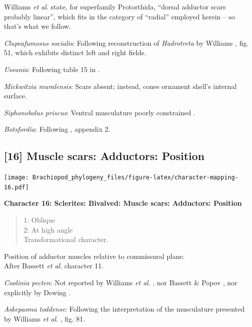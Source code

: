 \documentclass[]{book}
\theoremstyle{definition}
\theoremstyle{definition}
\theoremstyle{definition}
\theoremstyle{remark}
\begin{document}
Williams \emph{et al}.
\citeyearpar{Williams2000BrachiopodaLinguliformea} state, for
superfamily Protorthida, ``dorsal adductor scars probably linear'',
which fits in the category of ``radial'' employed herein -- so that's
what we follow.

\emph{Clupeafumosus socialis}: Following reconstruction of
\emph{Hadrotreta} by Williams
\citeyearpar{Williams2000BrachiopodaLinguliformea}, fig. 51, which
exhibits distinct left and right fields.

\emph{Ussunia}: Following table 15 in
\citet{Williams2000BrachiopodaLinguliformea}.

\emph{Mickwitzia muralensis}: Scars absent; instead, cones ornament
shell's internal surface.

\emph{Siphonobolus priscus}: Ventral musculature poorly constrained
\citep{Williams2000BrachiopodaLinguliformea, Popov2009Earlyontogeny}.

\emph{Botsfordia}: Following \citet{Williams1998Thediversity}, appendix
2.

\hypertarget{muscle-scars-adductors-position}{%
\subsection*{{[}16{]} Muscle scars: Adductors:
Position}\label{muscle-scars-adductors-position}}

\texttt{[image: Brachiopod\_phylogeny\_files/figure-latex/character-mapping-16.pdf]}

\textbf{Character 16: Sclerites: Bivalved: Muscle scars: Adductors:
Position}

\begin{quote}
1: Oblique\\
2: At high angle\\
Transformational character.
\end{quote}

Position of adductor muscles relative to commissural plane.\\
After Bassett \emph{et al}.
\citeyearpar{Bassett2001Functionalmorphology} character 11.

\emph{Coolinia pecten}: Not reported by Williams \emph{et al}.
\citeyearpar{Williams2000BrachiopodaLinguliformea}, nor Bassett \& Popov
\citeyearpar{Bassett2017Earliestontogeny}, nor explicitly by Dewing
\citeyearpar{Dewing2001Hingemodifications}.

\emph{Askepasma toddense}: Following the interpretation of the
musculature presented by Williams \emph{et al}.
\citeyearpar{Williams2000BrachiopodaLinguliformea}, fig. 81.
\end{document}
